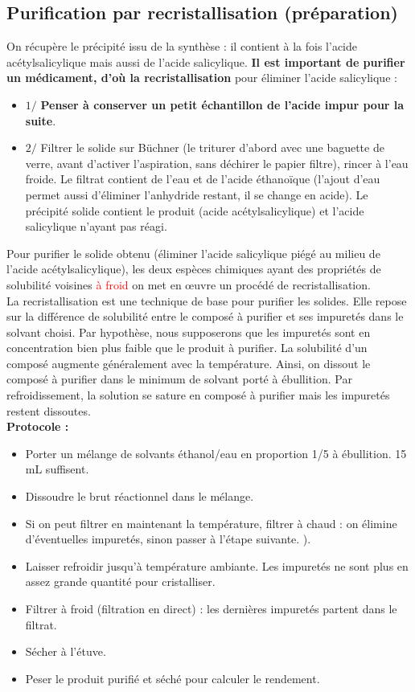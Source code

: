 \documentclass[11pt,a4paper]{report}
\begin{document}
\subsection{Purification par recristallisation (préparation)}

On récupère le précipité issu de la synthèse : il contient à la fois l'acide acétylsalicylique mais aussi de l'acide salicylique. \textbf{Il est important de purifier un médicament, d'où la recristallisation} pour éliminer l'acide salicylique :
\begin{itemize}
	\item $1/$ \textbf{Penser à conserver un petit échantillon de l'acide impur pour la suite}.
	\item $2/$ Filtrer le solide sur Büchner (le triturer d'abord avec une baguette de verre, 					avant d'activer l'aspiration, sans déchirer le papier filtre), rincer à l'eau froide. 				Le filtrat contient de l'eau et de l'acide éthanoïque (l'ajout d'eau permet aussi 					d'éliminer l'anhydride restant, il se change en acide). Le précipité solide contient 				le produit (acide acétylsalicylique) et l'acide salicylique n'ayant pas réagi.\\
\end{itemize}

Pour purifier le solide obtenu (éliminer l'acide salicylique piégé au milieu de l'acide acétylsalicylique), les deux espèces chimiques ayant des propriétés de solubilité voisines \textcolor{red}{à froid} on met en œuvre un procédé de recristallisation.\\

La recristallisation est une technique de base pour purifier les solides. Elle repose sur la différence de solubilité entre le composé à purifier et ses impuretés dans le solvant choisi. Par hypothèse, nous supposerons que les impuretés sont en concentration bien plus faible que le produit à purifier. La solubilité d'un composé augmente généralement avec la température.
Ainsi, on dissout le composé à purifier dans le minimum de solvant porté à ébullition. Par refroidissement, la solution se sature en composé à purifier mais les impuretés restent dissoutes.\\

\textbf{Protocole :}
\begin{itemize}
	\item Porter un mélange de solvants éthanol/eau en proportion 1/5 à ébullition. 15 mL 						suffisent.
	\item Dissoudre le brut réactionnel dans le mélange. 
	\item Si on peut filtrer en maintenant la température, filtrer à chaud : on élimine 						d'éventuelles impuretés, sinon passer à l'étape suivante.				).
	\item Laisser refroidir jusqu'à température ambiante. Les impuretés ne sont plus en assez 					grande quantité pour cristalliser.
	\item Filtrer à froid (filtration en direct) : les dernières impuretés partent dans le 						filtrat.
	\item Sécher à l'étuve.
	\item Peser le produit purifié et séché pour calculer le rendement.
\end{itemize}
\end{document}
